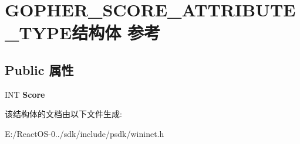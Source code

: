 \hypertarget{struct_g_o_p_h_e_r___s_c_o_r_e___a_t_t_r_i_b_u_t_e___t_y_p_e}{}\section{G\+O\+P\+H\+E\+R\+\_\+\+S\+C\+O\+R\+E\+\_\+\+A\+T\+T\+R\+I\+B\+U\+T\+E\+\_\+\+T\+Y\+P\+E结构体 参考}
\label{struct_g_o_p_h_e_r___s_c_o_r_e___a_t_t_r_i_b_u_t_e___t_y_p_e}
\subsection*{Public 属性}
\begin{DoxyCompactItemize}
\item 
\mbox{\label{struct_g_o_p_h_e_r___s_c_o_r_e___a_t_t_r_i_b_u_t_e___t_y_p_e_acd780d57e6f4740a84b0eb3634f250d3}} 
I\+NT {\bfseries Score}
\end{DoxyCompactItemize}


该结构体的文档由以下文件生成\+:\begin{DoxyCompactItemize}
\item 
E\+:/\+React\+O\+S-\/0../sdk/include/psdk/wininet.\+h\end{DoxyCompactItemize}
